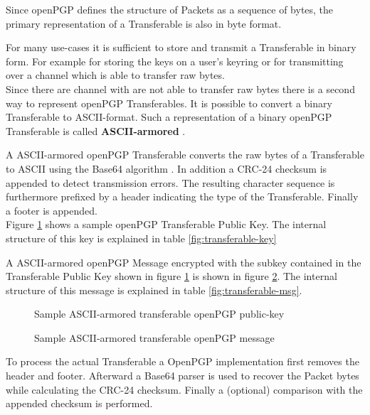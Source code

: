 Since openPGP defines the structure of Packets as a sequence of bytes, the primary representation of a Transferable is also in byte format.

For many use-cases it is sufficient to store and transmit a Transferable in binary form. For example for storing the keys on a user's keyring or for transmitting over a channel which is able to transfer raw bytes. \\


Since there are channel with are not able to transfer raw bytes there is a second way to represent openPGP Transferables. It is possible to convert a binary Transferable to ASCII-format. Such a representation of a binary openPGP Transferable is called \textbf{ASCII-armored} \cite[section 6]{RFC4880}.

A ASCII-armored openPGP Transferable converts the raw bytes of a Transferable to ASCII using the Base64 algorithm \citep{RFC4648}. In addition a CRC-24 \cite[section 6.1]{RFC4880} checksum is appended to detect transmission errors. The resulting character sequence is furthermore prefixed by a header indicating the type of the Transferable. Finally a footer is appended. \\

Figure \ref{fig:key} shows a sample openPGP Transferable Public Key. The internal structure of this key is explained in table \ref{fig:transferable-key}

A ASCII-armored openPGP Message encrypted with the subkey contained in the Transferable Public Key shown in figure \ref{fig:key} is shown in figure \ref{fig:msg}. The internal structure of this message is explained in table \ref{fig:transferable-msg}. \\

\begin{figure}[p]
	\centering
	
	\caption{Sample ASCII-armored transferable openPGP public-key}
	\label{fig:key}
\end{figure}

\begin{figure}[p]
	\centering
	
	\caption{Sample ASCII-armored transferable openPGP message}
	\label{fig:msg}
\end{figure}

To process the actual Transferable a OpenPGP implementation first removes the header and footer. Afterward a Base64 parser is used to recover the Packet bytes while calculating the CRC-24 checksum. Finally a (optional) comparison with the appended checksum is performed.



